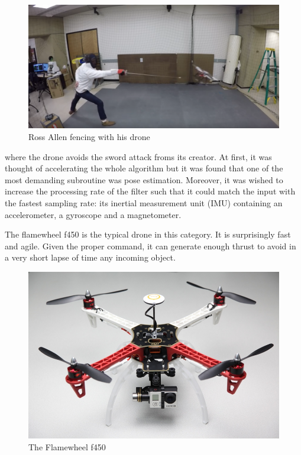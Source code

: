 \documentclass[12pt,]{article}
\begin{document}
\begin{figure}
\centering
\includegraphics{fencing.png}
\caption{Ross Allen fencing with his drone}
\end{figure}

where the drone avoids the sword attack froms its creator. At first, it
was thought of accelerating the whole algorithm but it was found that
one of the most demanding subroutine was pose estimation. Moreover, it
was wished to increase the processing rate of the filter such that it
could match the input with the fastest sampling rate: its inertial
measurement unit (IMU) containing an accelerometer, a gyroscope and a
magnetometer.

The flamewheel f450 is the typical drone in this category. It is
surprisingly fast and agile. Given the proper command, it can generate
enough thrust to avoid in a very short lapse of time any incoming
object.

\begin{figure}
\centering
\includegraphics{f450.jpg}
\caption{The Flamewheel f450}
\end{figure}
\end{document}
